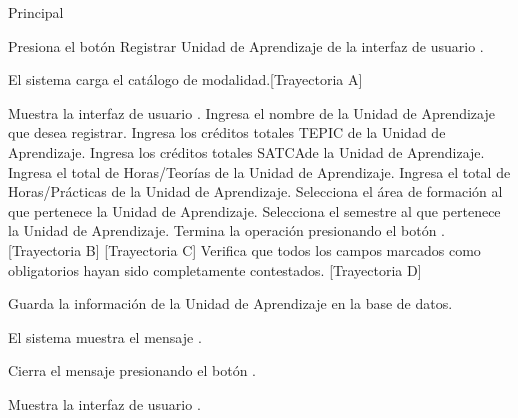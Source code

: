 \begin{UCtrayectoria}{Principal}

    \UCpaso[\UCactor] Presiona el botón Registrar Unidad de Aprendizaje de la interfaz de usuario .

    \UCpaso El sistema carga el catálogo de modalidad.[Trayectoria A]


    \UCpaso Muestra la interfaz de usuario .
    \UCpaso[\UCactor] Ingresa el nombre de la Unidad de Aprendizaje que desea registrar.
    \UCpaso[\UCactor] Ingresa los créditos totales TEPIC de la Unidad de Aprendizaje.
    \UCpaso[\UCactor] Ingresa los créditos totales SATCAde la Unidad de Aprendizaje.
    \UCpaso[\UCactor] Ingresa el total de Horas/Teorías de la Unidad de Aprendizaje.
    \UCpaso[\UCactor] Ingresa el total de Horas/Prácticas de la Unidad de Aprendizaje.
    \UCpaso[\UCactor] Selecciona el área de formación al que pertenece la Unidad de Aprendizaje.
    \UCpaso[\UCactor] Selecciona el semestre al que pertenece la Unidad de Aprendizaje.
    \UCpaso[\UCactor] Termina la operación presionando el botón . [Trayectoria B] [Trayectoria C]
    \UCpaso Verifica que todos los campos marcados como obligatorios hayan sido completamente contestados. [Trayectoria D]

    \UCpaso Guarda la información de la Unidad de Aprendizaje en la base de datos.

    \UCpaso El sistema muestra el mensaje .

    \UCpaso[\UCactor] Cierra el mensaje presionando el botón .

    \UCpaso Muestra la interfaz de usuario .
\end{UCtrayectoria}


\begin{comment}
\begin{UCtrayectoriaA}{A}{El sistema no encuentra ningún formulario para mostrar.}
	\UCpaso No encuentra ningún formulario para mostrar.
    \UCpaso El sistema muestra el mensaje \MSGref{MSG6}{Por el momento no se puede registrar la bibliografía}.
    \UCpaso[\UCactor] Cierra el mensaje presionando el botón \IUbutton{Aceptar}.
    \UCpaso Continua en el paso 1 de la trayectoria principal del \UCref{CU1}.
\end{UCtrayectoriaA}
\end{comment}

